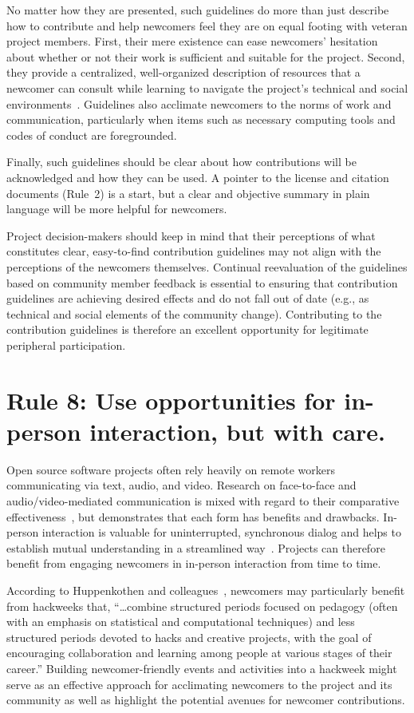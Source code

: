 \documentclass[10pt,letterpaper]{article}
\newcommand{\rulemajor}[1]{\section*{#1}}
\begin{document}
No matter how they are presented,
such guidelines do more than just describe how to contribute
and help newcomers feel they are on equal footing with veteran project members.
First,
their mere existence can ease newcomers' hesitation
about whether or not their work is sufficient and suitable for the project.
Second,
they provide a centralized, well-organized description of resources
that a newcomer can consult while learning to navigate the project's technical and social environments~\cite{zanatta2017}.
Guidelines also acclimate newcomers to the norms of work and communication,
particularly when items such as necessary computing tools and codes of conduct are foregrounded.

Finally,
such guidelines should be clear about how contributions will be acknowledged
and how they can be used.
A pointer to the license and citation documents (Rule~2) is a start,
but a clear and objective summary in plain language will be more helpful for newcomers.

Project decision-makers should keep in mind
that their perceptions of what constitutes clear, easy-to-find contribution guidelines
may not align with the perceptions of the newcomers themselves.
Continual reevaluation of the guidelines based on community member feedback is essential
to ensuring that contribution guidelines are achieving desired effects
and do not fall out of date (e.g., as technical and social elements of the community change).
Contributing to the contribution guidelines is therefore
an excellent opportunity for legitimate peripheral participation.

\rulemajor{Rule 8: Use opportunities for in-person interaction, but with care.}

Open source software projects often rely heavily on remote workers communicating via text, audio, and video.
Research on face-to-face and audio/video-mediated communication is mixed
with regard to their comparative effectiveness~\cite{doherty1997,gallupe1990,nardi2002},
but demonstrates that each form has benefits and drawbacks.
In-person interaction is valuable for uninterrupted, synchronous dialog
and helps to establish mutual understanding in a streamlined way~\cite{omalley1996}.
Projects can therefore benefit from engaging newcomers in in-person interaction from time to time.

According to Huppenkothen and colleagues~\cite{huppenkothen2018},
newcomers may particularly benefit from hackweeks that,
``{\ldots}combine structured periods focused on pedagogy
(often with an emphasis on statistical and computational techniques)
and less structured periods devoted to hacks and creative projects,
with the goal of encouraging collaboration and learning among people at various stages of their career.''
Building newcomer-friendly events and activities into a hackweek
might serve as an effective approach for acclimating newcomers to the project and its community
as well as highlight the potential avenues for newcomer contributions.
\end{document}
